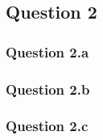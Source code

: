 \subsection{Question 2}
\label{subsec:312}

\subsubsection{Question 2.a}
\label{subsubsec:312a}

\subsubsection{Question 2.b}
\label{subsubsec:312b}

\subsubsection{Question 2.c}
\label{subsubsec:312c}